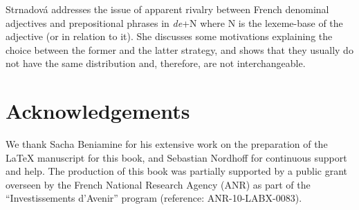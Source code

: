 \documentclass[output=paper]{langsci/langscibook}
\begin{document}
Strnadová addresses the issue of apparent rivalry between French
denominal adjectives and prepositional phrases in \emph{de}+N where N is the
lexeme-base of the adjective (or in relation to it). She discusses some
motivations explaining the choice between the former and the latter
strategy, and shows that they usually do not have  the same distribution
and, therefore, are not interchangeable.

\section*{Acknowledgements}

\sloppy
We thank Sacha Beniamine for his extensive work on the preparation of the {\LaTeX} manu\-script for this book, and Sebastian Nordhoff for continuous support and help. 
The production of this book was partially supported  by a public grant
    overseen by the French National Research Agency (ANR) as part of
    the ``Investissements d'Avenir'' program (reference:
    ANR-10-LABX-0083).



{\sloppy
    \printbibliography[heading=subbibliography,notkeyword=this]
}
\end{document}
